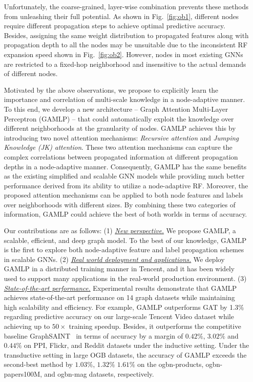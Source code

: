 \documentclass[sigconf]{acmart}
\newcommand{\sys}{\textsc{GAMLP}\xspace}
\begin{document}
Unfortunately, the coarse-grained, layer-wise combination prevents these methods from unleashing their full potential.
As shown in Fig.~\ref{fig:ob1}, different nodes require different propagation steps to achieve optimal predictive accuracy. 
Besides, assigning the same weight distribution to propagated features along with propagation depth to all the nodes may be unsuitable due to the inconsistent RF expansion speed shown in Fig.~\ref{fig:ob2}.
However, nodes in most existing GNNs are restricted to a fixed-hop neighborhood and insensitive to the actual demands of different nodes. 

Motivated by the above observations, we propose to explicitly learn the importance and correlation of multi-scale knowledge in a node-adaptive manner. 
To this end, we develop a new architecture -- Graph Attention Multi-Layer Perceptron (GAMLP) -- that could automatically exploit the knowledge over different neighborhoods at the granularity of nodes.
GAMLP achieves this by introducing two novel attention mechanisms: \emph{Recursive attention} and \emph{Jumping Knowledge (JK) attention}. 
These two attention mechanisms can capture the complex correlations between propagated information at different propagation depths in a node-adaptive manner.
Consequently, \sys has the same benefits as the existing simplified and scalable GNN models while providing much better performance derived from its ability to utilize a node-adaptive RF.
Moreover, the proposed attention mechanisms can be applied to both node features and labels over neighborhoods with different sizes. 
By combining these two categories of information, GAMLP could achieve the best of both worlds in terms of accuracy.




Our contributions are as follows: 
(1) \textit{\underline{New perspective.}} We propose GAMLP, a scalable, efficient, and deep graph model. To the best of our knowledge, GAMLP is the first to explore both node-adaptive feature and label propagation schemes in scalable GNNs.
(2) \textit{\underline{Real world deployment and applications.}} We deploy GAMLP in a distributed training manner in Tencent, and it has been widely used to support many applications in the real-world production environment.
(3) \textit{\underline{State-of-the-art performance.}} Experimental results demonstrate that GAMLP achieves state-of-the-art performance on 14 graph datasets while maintaining high scalability and efficiency.
For example, \sys outperforms GAT by 1.3\% regarding predictive accuracy on our large-scale Tencent Video dataset while achieving up to $50\times$ training speedup.
Besides, it outperforms the competitive baseline GraphSAINT~\citep{DBLP:conf/iclr/ZengZSKP20} in terms of accuracy by a margin of $0.42\%$, $3.02\%$ and $0.44\%$ on PPI, Flickr, and Reddit datasets under the inductive setting.
Under the transductive setting in large OGB datasets, the accuracy of \sys exceeds the second-best method by $1.03\%$, $1.32\%$ $1.61\%$ on the ogbn-products, ogbn-papers100M, and ogbn-mag datasets, respectively. 
\end{document}
